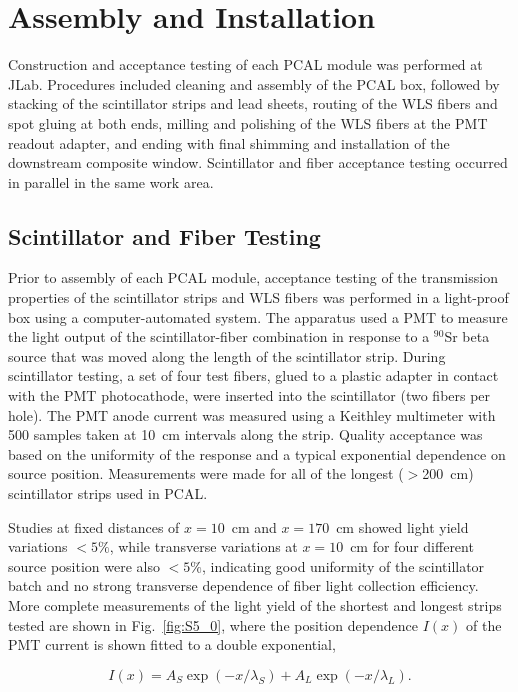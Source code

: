 \section{Assembly and Installation}

Construction and acceptance testing of each PCAL module was performed at JLab. Procedures included cleaning
and assembly of the PCAL box, followed by stacking of the scintillator strips and lead sheets, routing of the WLS
fibers and spot gluing at both ends, milling and polishing of the WLS fibers at the PMT readout adapter, and
ending with final shimming and installation of the downstream composite window. Scintillator and fiber acceptance
testing occurred in parallel in the same work area.

\subsection{Scintillator and Fiber Testing}

Prior to assembly of each PCAL module, acceptance testing of the transmission properties of the scintillator strips
and WLS fibers was performed in a light-proof box using a computer-automated system. The apparatus used a
PMT to measure the light output of the scintillator-fiber combination in response to a $^{90}$Sr beta source that
was moved along the length of the scintillator strip. During scintillator testing, a set of four test fibers, glued to a
plastic adapter in contact with the PMT photocathode, were inserted into the scintillator (two fibers per hole).
The PMT anode current was measured using a Keithley multimeter with 500 samples taken at 10~cm intervals along
the strip. Quality acceptance was based on the uniformity of the response and a typical exponential dependence on
source position. Measurements were made for all of the longest ($>$200~cm) scintillator strips used in PCAL.

Studies at fixed distances of $x=10$~cm and $x=170$~cm showed light yield variations $<5\%$, while transverse
variations at $x=10$~cm for four different source position were also $<5\%$, indicating good uniformity of the
scintillator batch and no strong transverse dependence of fiber light collection efficiency. More complete
measurements of the light yield of the shortest and longest strips tested are shown in Fig.~\ref{fig:S5_0}, where
the position dependence $I(x)$ of the PMT current is shown fitted to a double exponential,

\begin{equation}
I(x) = A_S \exp(-x/\lambda_S)+A_L \exp(-x/\lambda_L).
\end{equation}

